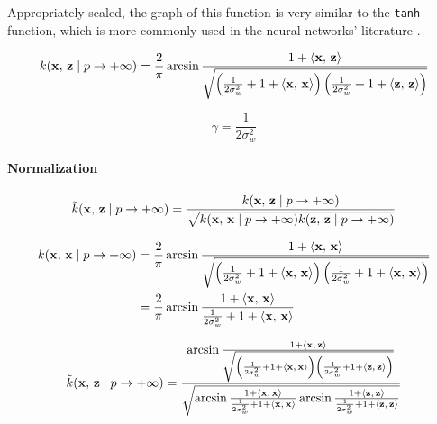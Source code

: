 Appropriately scaled, the graph of this function is very similar to the
\texttt{tanh} function, which is more commonly used in the neural networks'
literature \cite{williamsComputationInfiniteNeural1998}.

\begin{equation}
    k(\mathbf{x},\,\mathbf{z} \mid p \to + \infty)  = \frac{2}{\pi}
    \arcsin \frac{1 + \left\langle \mathbf{x},\,\mathbf{z} \right\rangle}{\sqrt{
            \left(
            \frac{1}{2\sigma_w^2} + 1 + \left\langle \mathbf{x},\,\mathbf{x} \right\rangle
            \right)
            \left(
            \frac{1}{2\sigma_w^2} + 1 + \left\langle \mathbf{z},\,\mathbf{z} \right\rangle
            \right)
        }}
\end{equation}

\begin{equation}
    \gamma = \frac{1}{2\sigma_w^2}
\end{equation}

\paragraph{Normalization}

\begin{equation}
    \tilde{k}(\mathbf{x},\,\mathbf{z} \mid p \to + \infty) = \frac{
        k(\mathbf{x},\,\mathbf{z} \mid p \to + \infty) }{
        \sqrt{
            k(\mathbf{x},\,\mathbf{x} \mid p \to + \infty)
            k(\mathbf{z},\,\mathbf{z} \mid p \to + \infty)
        }
    }
\end{equation}

\begin{align*}
    k(\mathbf{x},\,\mathbf{x} \mid p \to + \infty)
     & = \frac{2}{\pi}
    \arcsin \frac{1 + \left\langle \mathbf{x},\,\mathbf{x} \right\rangle}{\sqrt{
            \left(
            \frac{1}{2\sigma_w^2} + 1 + \left\langle \mathbf{x},\,\mathbf{x} \right\rangle
            \right)
            \left(
            \frac{1}{2\sigma_w^2} + 1 + \left\langle \mathbf{x},\,\mathbf{x} \right\rangle
            \right)
    }}                 \\
     & = \frac{2}{\pi}
    \arcsin \frac{1 + \left\langle \mathbf{x},\,\mathbf{x} \right\rangle}{
        \frac{1}{2\sigma_w^2} + 1 + \left\langle \mathbf{x},\,\mathbf{x} \right\rangle
    }
\end{align*}

\begin{equation}
    \tilde{k}(\mathbf{x},\,\mathbf{z} \mid p \to + \infty) =
    \frac{
        \arcsin \frac{1 + \left\langle \mathbf{x},\,\mathbf{z} \right\rangle}{\sqrt{
                \left(
                \frac{1}{2\sigma_w^2} + 1 + \left\langle \mathbf{x},\,\mathbf{x} \right\rangle
                \right)
                \left(
                \frac{1}{2\sigma_w^2} + 1 + \left\langle \mathbf{z},\,\mathbf{z} \right\rangle
                \right)
            }}
    }{
        \sqrt{
            \arcsin \frac{1 + \left\langle \mathbf{x},\,\mathbf{x} \right\rangle}{
                \frac{1}{2\sigma_w^2} + 1 + \left\langle \mathbf{x},\,\mathbf{x} \right\rangle
            }
            \arcsin \frac{1 + \left\langle \mathbf{z},\,\mathbf{z} \right\rangle}{
                \frac{1}{2\sigma_w^2} + 1 + \left\langle \mathbf{z},\,\mathbf{z} \right\rangle
            }
        }
    }
\end{equation}

